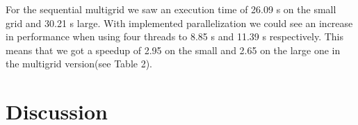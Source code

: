 \documentclass{article}
\begin{document}
For the sequential multigrid we saw an execution time of 26.09 s on the small grid and 30.21 s large. With implemented parallelization we could see an increase in performance when using four threads to 8.85 s and 11.39 s respectively. This means that we got a speedup of 2.95 on the small and 2.65 on the large one in the multigrid version(see Table 2).

\begin{table}
\centering
{}
\caption{Sequential Multigrid test results}
\label{fig:multigrid}
\end{table}



\section{Discussion}\label{discussion}
\end{document}
